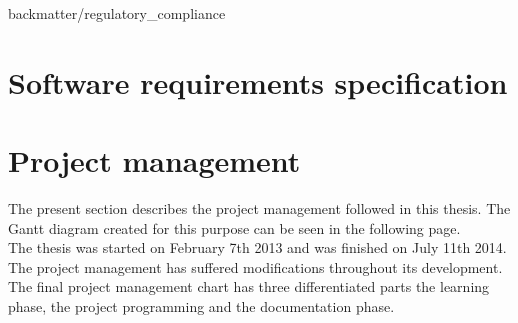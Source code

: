 \begin{appendices}

	 {backmatter/regulatory_compliance}

	\chapter{Software requirements specification}
	\label{requirements}
			


	\chapter{Project management}
	\label{project_management}
		 The present section describes the project management followed in this thesis. The Gantt diagram created for this purpose can be seen in the following page.
		 \\

		 The thesis was started on February 7th 2013 and was finished on July 11th 2014.    
		 The project management has suffered modifications throughout its development.  The final project management chart has three differentiated parts the learning phase, the project programming and the documentation phase. 
\\


\end{appendices}
